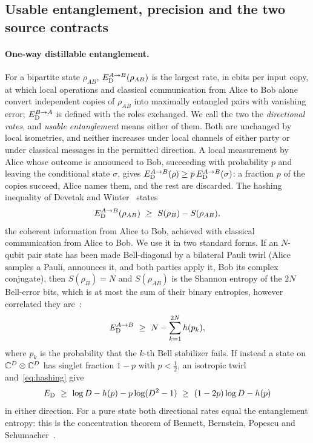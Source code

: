 \subsection{Usable entanglement, precision and the two source contracts}\label{sec:prelim-usable}

\paragraph{One-way distillable entanglement.} For a bipartite state $\rho_{AB}$, $E_{\mathrm D}^{A\to B}(\rho_{AB})$ is the largest
rate, in ebits per input copy, at which local operations and classical communication from Alice to Bob alone convert
independent copies of $\rho_{AB}$ into maximally entangled pairs with vanishing error; $E_{\mathrm D}^{B\to A}$ is defined with the
roles exchanged. We call the two the \emph{directional rates}, and \emph{usable entanglement} means either of them. Both
are unchanged by local isometries, and neither increases under local channels of either party or under classical
messages in the permitted direction. A local measurement by Alice whose outcome is announced to Bob, succeeding with
probability $p$ and leaving the conditional state $\sigma$, gives $E_{\mathrm D}^{A\to B}(\rho)\ge p\,E_{\mathrm D}^{A\to B}(\sigma)$: a
fraction $p$ of the copies succeed, Alice names them, and the rest are discarded. The hashing inequality of Devetak and
Winter~\cite{DW05} states
\begin{equation}\label{eq:hashing}
E_{\mathrm D}^{A\to B}(\rho_{AB})\ \ge\ S(\rho_B)-S(\rho_{AB}),
\end{equation}
the coherent information from Alice to Bob, achieved with classical communication from Alice to Bob. We use it in two
standard forms. If an $N$-qubit pair state has been made Bell-diagonal by a bilateral Pauli twirl (Alice samples a Pauli,
announces it, and both parties apply it, Bob its complex conjugate), then $S(\rho_B)=N$ and $S(\rho_{AB})$ is the Shannon
entropy of the $2N$ Bell-error bits, which is at most the sum of their binary entropies, however correlated they
are~\cite{BDSW96}:
\begin{equation}\label{eq:bell-hashing}
E_{\mathrm D}^{A\to B}\ \ge\ N-\sum_{k=1}^{2N}h(p_k),
\end{equation}
where $p_k$ is the probability that the $k$-th Bell stabilizer fails. If instead a state on $\mathbb C^D\otimes\mathbb C^D$ has singlet
fraction $1-p$ with $p<\frac12$, an isotropic twirl and~\eqref{eq:hashing} give
\begin{equation}\label{eq:singlet-hashing}
E_{\mathrm D}\ \ge\ \log D-h(p)-p\log(D^2-1)\ \ge\ (1-2p)\log D-h(p)
\end{equation}
in either direction. For a pure state both directional rates equal the entanglement entropy: this is the concentration theorem
of Bennett, Bernstein, Popescu and Schumacher~\cite{BBPS96}.


